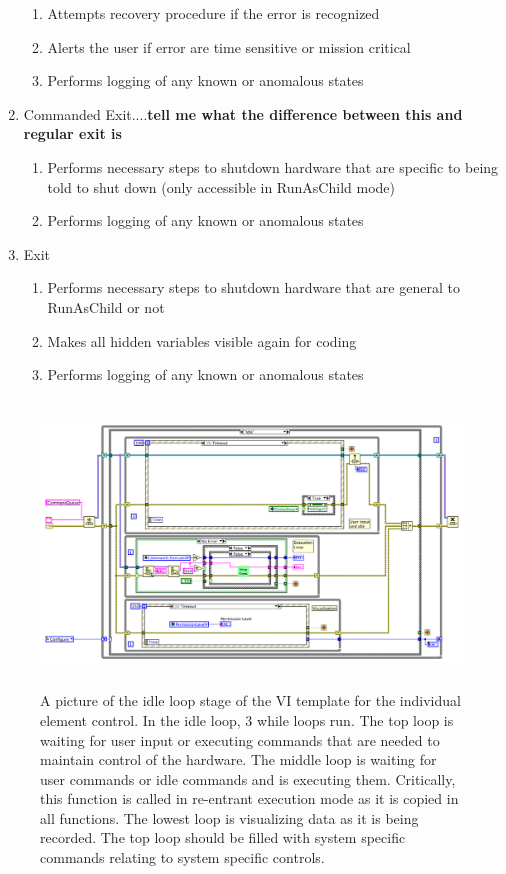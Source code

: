 \begin{enumerate}
\begin{enumerate}
		\item{Attempts recovery procedure if the error is recognized}
		\item{Alerts the user if error are time sensitive or mission critical}
		\item{Performs logging of any known or anomalous states}
	\end{enumerate}
	\item{Commanded Exit....\textbf{tell me what the difference between this and regular exit is}}
	\begin{enumerate}
		\item{Performs necessary steps to shutdown hardware that are specific to being told to shut down (only accessible in RunAsChild mode)}
		\item{Performs logging of any known or anomalous states}
	\end{enumerate}
	\item{Exit}
	\begin{enumerate}
		\item{Performs necessary steps to shutdown hardware that are general to RunAsChild or not}
		\item{Makes all hidden variables visible again for coding}
		\item{Performs logging of any known or anomalous states}
	\end{enumerate}
\end{enumerate}


\begin{figure}[!h]\centering
\includegraphics[height=3in]{Figures/MainVITemplateBackPanel}
\caption{A picture of the idle loop stage of the VI template for the individual element control. In the idle loop, 3 while loops run. The top loop is waiting for user input or executing commands that are needed to maintain control of the hardware. The middle loop is waiting for user commands or idle commands and is executing them. Critically, this function is called in re-entrant execution mode as it is copied in all functions. The lowest loop is visualizing data as it is being recorded. The top loop should be filled with system specific commands relating to system specific controls.}\label{Fig:VITemplateBP}
\end{figure}


